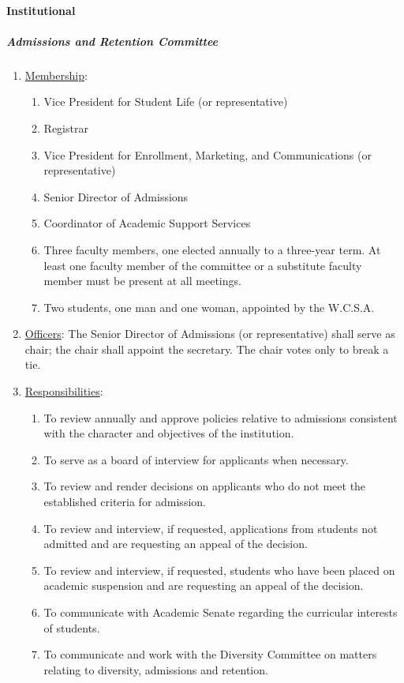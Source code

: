 			\paragraph{Institutional}
				\subparagraph{Admissions and Retention Committee}
					\begin{enumerate}[label=\alph*)]
						\item{\underline{Membership}:
							\begin{enumerate}[label=\arabic*)]
								\item{Vice President for Student Life (or representative)}
								\item{Registrar}
								\item{Vice President for Enrollment, Marketing, and Communications (or representative)}
								\item{Senior Director of Admissions}
								\item{Coordinator of Academic Support Services}
								\item{Three faculty members, one elected annually to a three-year term.  At least one faculty member of the committee or a substitute faculty member must be present at all meetings.}
								\item{Two students, one man and one woman, appointed by the W.C.S.A.}
							\end{enumerate}
						}
						\item{\underline{Officers}:
							The Senior Director of Admissions (or representative) shall serve as chair; the chair shall appoint the secretary.  The chair votes only to break a tie.
						}
						\item{\underline{Responsibilities}:
							\begin{enumerate}[label=\arabic*)]
								\item{To review annually and approve policies relative to admissions consistent with the character and objectives of the institution.}
								\item{To serve as a board of interview for applicants when necessary.}
								\item{To review and render decisions on applicants who do not meet the established criteria for admission.}
								\item{To review and interview, if requested, applications from students not admitted and are requesting an appeal of the decision.}
								\item{To review and interview, if requested, students who have been placed on academic suspension and are requesting an appeal of the decision.}
								\item{To communicate with Academic Senate regarding the curricular interests of students.}
								\item{To communicate and work with the Diversity Committee on matters relating to diversity, admissions and retention.}
							\end{enumerate}
						}
					\end{enumerate}
